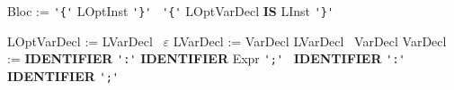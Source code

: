 \documentclass[12pt,a4paper]{article}
\begin{document}
{\sffamily
Bloc  := \verb|'{'| LOptInst \verb|'}'| \textbar \ \verb|'{'| LOptVarDecl \textbf{IS} LInst \verb|'}'|

LOptVarDecl := LVarDecl \textbar \ $\varepsilon$ \newline
LVarDecl := VarDecl LVarDecl \textbar \ VarDecl \newline
VarDecl := \textbf{IDENTIFIER} \verb|':'| \textbf{IDENTIFIER} Expr \verb|';'| \newline
\hspace*{1em} \textbar \ \textbf{IDENTIFIER} \verb|':'| \textbf{IDENTIFIER} \verb|';'| \newline
}
\end{document}
